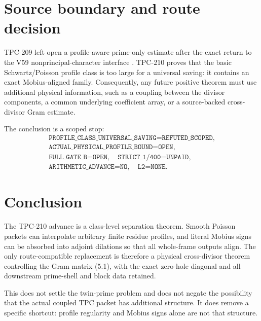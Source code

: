 \documentclass[11pt]{article}
\begin{document}
\section{Source boundary and route decision}

TPC-209 left open a profile-aware prime-only estimate after the exact return to
the V59 nonprincipal-character interface \cite{Wang2026V59}.  TPC-210 proves
that the basic Schwartz/Poisson profile class is too large for a universal
saving: it contains an exact Mobius-aligned family.  Consequently, any future
positive theorem must use additional physical information, such as a coupling
between the divisor components, a common underlying coefficient array, or a
source-backed cross-divisor Gram estimate.

The conclusion is a scoped stop:
\[
\begin{gathered}
\texttt{PROFILE\_CLASS\_UNIVERSAL\_SAVING=REFUTED\_SCOPED},\\
\texttt{ACTUAL\_PHYSICAL\_PROFILE\_BOUND=OPEN},\\
\texttt{FULL\_GATE\_B=OPEN},\quad
\texttt{STRICT\_1/400=UNPAID},\\
\texttt{ARITHMETIC\_ADVANCE=NO},\quad
\texttt{L2=NONE}.
\end{gathered}
\]

\section{Conclusion}

The TPC-210 advance is a class-level separation theorem.  Smooth Poisson
packets can interpolate arbitrary finite residue profiles, and literal Mobius
signs can be absorbed into adjoint dilations so that all whole-frame outputs
align.  The only route-compatible replacement is therefore a physical
cross-divisor theorem controlling the Gram matrix (5.1), with the exact
zero-hole diagonal and all downstream prime-shell and block data retained.

This does not settle the twin-prime problem and does not negate the possibility
that the actual coupled TPC packet has additional structure.  It does remove a
specific shortcut: profile regularity and Mobius signs alone are not that
structure.



\end{document}
